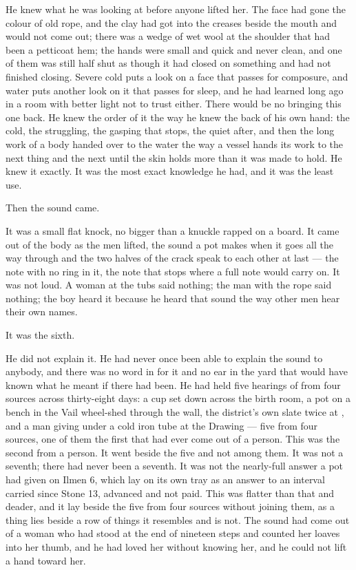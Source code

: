 He knew what he was looking at before anyone lifted her. The face had gone the colour of old rope, and the clay had got into the creases beside the mouth and would not come out; there was a wedge of wet wool at the shoulder that had been a petticoat hem; the hands were small and quick and never clean, and one of them was still half shut as though it had closed on something and had not finished closing. Severe cold puts a look on a face that passes for composure, and water puts another look on it that passes for sleep, and he had learned long ago in a room with better light not to trust either. There would be no bringing this one back. He knew the order of it the way he knew the back of his own hand: the cold, the struggling, the gasping that stops, the quiet after, and then the long work of a body handed over to the water the way a vessel hands its work to the next thing and the next until the skin holds more than it was made to hold. He knew it exactly. It was the most exact knowledge he had, and it was the least use.

Then the sound came.

It was a small flat knock, no bigger than a knuckle rapped on a board. It came out of the body as the men lifted, the sound a pot makes when it goes all the way through and the two halves of the crack speak to each other at last --- the note with no ring in it, the note that stops where a full note would carry on. It was not loud. A woman at the tubs said nothing; the man with the rope said nothing; the boy heard it because he heard that sound the way other men hear their own names.

It was the sixth.

He did not explain it. He had never once been able to explain the sound to anybody, and there was no word in  for it and no ear in the yard that would have known what he meant if there had been. He had held five hearings of  from four sources across thirty-eight days: a cup set down across the birth room, a pot on a bench in the Vail wheel-shed through the wall, the district's own slate twice at , and a man giving under a cold iron tube at the Drawing --- five from four sources, one of them the first that had ever come out of a person. This was the second from a person. It went beside the five and not among them. It was not a seventh; there had never been a seventh. It was not the nearly-full answer a pot had given on Ilmen 6, which lay on its own tray as an answer to an interval carried since Stone 13, advanced and not paid. This was flatter than that and deader, and it lay beside the five from four sources without joining them, as a thing lies beside a row of things it resembles and is not. The sound had come out of a woman who had stood at the end of nineteen steps and counted her loaves into her thumb, and he had loved her without knowing her, and he could not lift a hand toward her.

